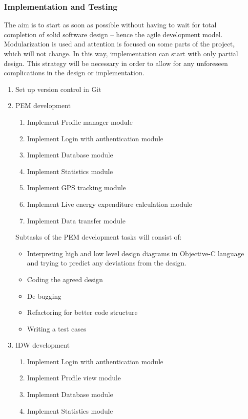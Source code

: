 \documentclass[12pt, a4paper]{report}   %
\begin{document}
\subsubsection{Implementation and Testing}
The aim is to start as soon as possible without having to wait for total completion of solid software design – hence the agile development model. Modularization is used and attention is focused on some parts of the project, which will not change. In this way, implementation can start with only partial design. This strategy will be necessary in order to allow for any unforeseen complications in the design or implementation.
\begin{enumerate}
	\item Set up version control in Git
	\item PEM development
		\begin{enumerate}
			\item Implement Profile manager module
			\item Implement Login with authentication module
			\item Implement Database module
			\item Implement Statistics module
			\item Implement GPS tracking module
			\item Implement Live energy expenditure calculation module
			\item Implement Data transfer module
		\end{enumerate}
		Subtasks of the PEM development tasks will consist of:
		\begin{itemize}
			\item Interpreting high and low level design diagrams in Objective-C language and trying to predict any deviations from the design.
			\item Coding the agreed design
			\item De-bugging
			\item Refactoring for better code structure
			\item Writing a test cases
		\end{itemize}
	\item IDW development
		\begin{enumerate}
			\item Implement Login with authentication module
			\item Implement Profile view module
			\item Implement Database module
			\item Implement Statistics module

\end{enumerate}
\end{enumerate}
\end{document}
